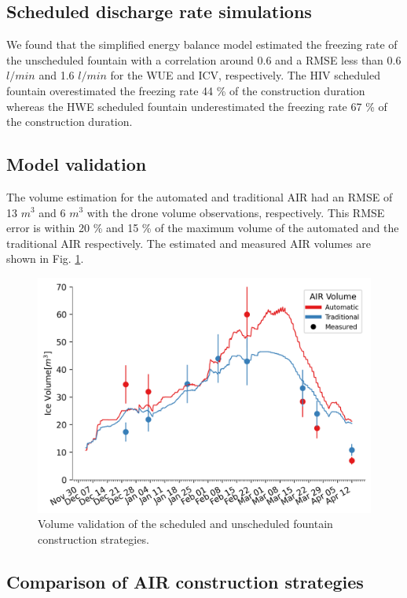 \documentclass[tc, manuscript]{copernicus}
\begin{document}
\subsection{Scheduled discharge rate simulations}

We found that the simplified energy balance model estimated the freezing rate of the unscheduled fountain with a
correlation around 0.6 and a RMSE less than 0.6 $l/min$ and 1.6  $l/min$ for the WUE and ICV,
respectively. The HIV scheduled fountain overestimated the freezing rate 44 \% of the construction duration
whereas the HWE scheduled fountain underestimated the freezing rate 67 \% of the construction duration.

\subsection{Model validation}

The volume estimation for the automated and traditional AIR had an RMSE of 13 $m^3$ and 6 $m^3$ with the drone
volume observations, respectively. This RMSE error is within 20 \% and 15 \% of the maximum volume of the
automated and the traditional AIR respectively. The estimated and measured AIR volumes are shown in Fig.
\ref{fig:validation}.  

\begin{figure}[t] \includegraphics[width=12cm] {Figures/validation.png} \caption{Volume validation of the
scheduled and unscheduled fountain construction strategies.} \label{fig:validation} \end{figure}

\subsection{Comparison of AIR construction strategies}
\end{document}
